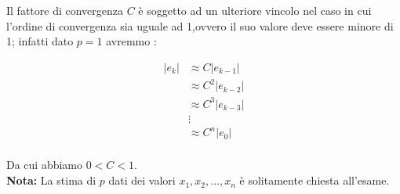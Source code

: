 \documentclass[12pt, a4paper]{book}
\theoremstyle{definition}
\begin{document}
\begin{flushleft}
Il fattore di convergenza $C$ è soggetto ad un ulteriore vincolo nel caso in cui l'ordine di convergenza sia uguale ad 1,ovvero il suo valore deve essere minore di 1; infatti dato $p=1$ avremmo :

\begin{equation}
	\begin{split}
		|e_{k}| & \approx C|e_{k-1}| \\
				  & \approx C^{2}|e_{k-2}| \\
				  & \approx C^{3}|e_{k-3}| \\
				  &  \vdots \\
				  &  \approx C^{n}|e_{0}| \\
	\end{split}
\end{equation}

Da cui abbiamo $0 < C < 1$.\\
\textbf{Nota:}  La stima di $p$ dati dei valori $x_{1}, x_{2},\dots, x_{n}$ è solitamente chiesta all'esame.
\end{flushleft}
\end{document}
